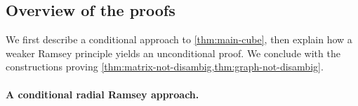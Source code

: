 \documentclass[11pt]{article}
\theoremstyle{remark}
\begin{document}




\subsection*{Overview of the proofs}

We first describe a conditional approach to \cref{thm:main-cube}, then explain how a weaker Ramsey principle yields an unconditional proof.
We conclude with the constructions proving \cref{thm:matrix-not-disambig,thm:graph-not-disambig}.

\paragraph{A conditional radial Ramsey approach.}
\end{document}
